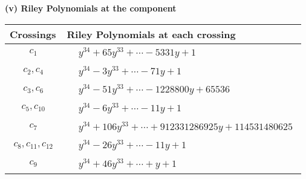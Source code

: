 \documentclass[1p]{elsarticle_modified}
\theoremstyle{definition}
\begin{document}
\flushleft \textbf{(v) Riley Polynomials at the component}\newline \\
\begin{tabular}{m{50pt}|m{274pt}}
Crossings & \hspace{64pt}Riley Polynomials at each crossing \\
\hline $$\begin{aligned}c_{1}\end{aligned}$$&$\begin{aligned}
&y^{34}+65 y^{33}+\cdots-5331 y+1
\end{aligned}$\\
\hline $$\begin{aligned}c_{2},c_{4}\end{aligned}$$&$\begin{aligned}
&y^{34}-3 y^{33}+\cdots-71 y+1
\end{aligned}$\\
\hline $$\begin{aligned}c_{3},c_{6}\end{aligned}$$&$\begin{aligned}
&y^{34}-51 y^{33}+\cdots-1228800 y+65536
\end{aligned}$\\
\hline $$\begin{aligned}c_{5},c_{10}\end{aligned}$$&$\begin{aligned}
&y^{34}-6 y^{33}+\cdots-11 y+1
\end{aligned}$\\
\hline $$\begin{aligned}c_{7}\end{aligned}$$&$\begin{aligned}
&y^{34}+106 y^{33}+\cdots+912331286925 y+114531480625
\end{aligned}$\\
\hline $$\begin{aligned}c_{8},c_{11},c_{12}\end{aligned}$$&$\begin{aligned}
&y^{34}-26 y^{33}+\cdots-11 y+1
\end{aligned}$\\
\hline $$\begin{aligned}c_{9}\end{aligned}$$&$\begin{aligned}
&y^{34}+46 y^{33}+\cdots+y+1
\end{aligned}$\\
\hline
\end{tabular}\\~\\
\end{document}
